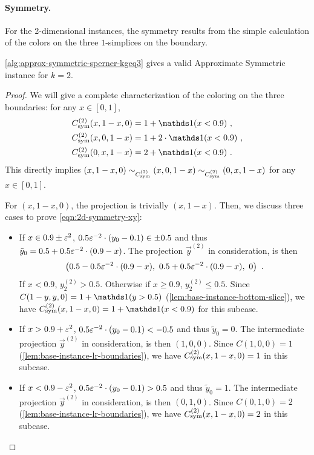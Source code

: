\paragraph{Symmetry.} For the 2-dimensional instances, the symmetry results from the simple calculation of the colors on the three $1$-simplices on the boundary.

\begin{lemma}
\label{lem:2d-symmetry}
\cref{alg:approx-symmetric-sperner-kgeq3} gives a valid \outofk Approximate Symmetric \Sperner instance for $k=2$. 
\end{lemma}
\begin{proof}
    We will give a complete characterization of the coloring on the three boundaries: for any $x\in [0,1]$,
    \begin{align}
        \Csym{2}(x,1-x,0)&=1+\ind(x<0.9)~, \label{eqn:2d-symmetry-xy}\\
        \Csym{2}(x,0,1-x)&=1+2\cdot \ind(x<0.9)~, \label{eqn:2d-symmetry-xz}\\
        \Csym{2}(0,x,1-x)&=2+\ind(x<0.9)~. \label{eqn:2d-symmetry-yz}
    \end{align}
    This directly implies $(x,1-x,0)\sim_{C_{\rm sym}^{(2)}}(x,0,1-x)\sim_{C_{\rm sym}^{(2)}}(0,x,1-x)$ for any $x\in [0,1]$. 

    For $(x,1-x,0)$, the projection is trivially $(x,1-x)$. Then, we discuss three cases to prove \cref{eqn:2d-symmetry-xy}:
    \begin{itemize}[itemsep=0.2em, topsep=0.5em]
        \item If $x\in 0.9\pm \varepsilon^2$, $0.5\varepsilon^{-2}\cdot (y_0-0.1)\in \pm 0.5$ and thus $\tilde{y}_0=0.5+0.5\varepsilon^{-2} \cdot (0.9-x)$. The projection $\vec{y}^{(2)}$ in consideration, is then 
        \[
            \left(0.5-0.5\eps^{-2} \cdot (0.9-x),\ 0.5+0.5\eps^{-2} \cdot (0.9-x),\ 0\right)~. 
        \]
        If $x<0.9$, $y_{2}^{(2)}>0.5$. Otherwise if $x\geq 0.9$, $y_{2}^{(2)}\leq 0.5$. 
        Since $C(1-y, y,0) = 1+\ind(y > 0.5)$ (\cref{lem:base-instance-bottom-slice}), we have $\Csym{2}(x, 1-x, 0)=1+\ind(x<0.9)$ for this subcase.
        \item If $x>0.9+\varepsilon^2$, $0.5\varepsilon^{-2}\cdot (y_0-0.1)<-0.5$ and thus $\tilde{y}_0=0$. The intermediate projection $\vec{y}^{(2)}$ in consideration, is then $(1,0,0)$. Since $C(1,0,0)=1$ (\cref{lem:base-instance-lr-boundaries}), we have $C_{\rm sym}^{(2)}(x, 1-x, 0)=1$ in this subcase.
        \item If $x<0.9-\varepsilon^2$, $0.5\varepsilon^{-2}\cdot (y_0-0.1)>0.5$ and thus $\tilde{y}_0=1$. The intermediate projection $\vec{y}^{(2)}$ in consideration, is then $(0,1,0)$. Since $C(0,1,0)=2$ (\cref{lem:base-instance-lr-boundaries}), we have $C_{\rm sym}^{(2)}(x, 1-x, 0)=2$ in this subcase.
    \end{itemize}


\end{proof}

